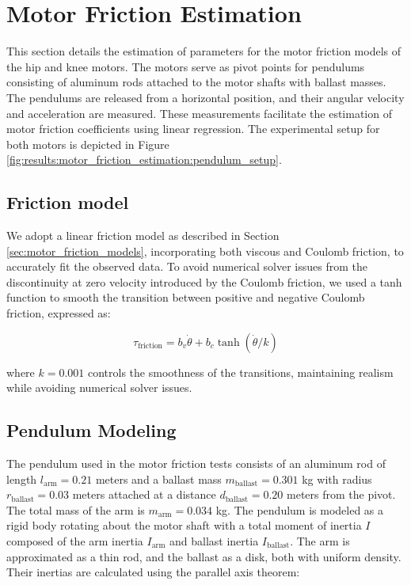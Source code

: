 \section{Motor Friction Estimation}
\label{sec:motor_friction_estimation}

This section details the estimation of parameters for the motor friction models of the hip and knee motors. The motors serve as pivot points for pendulums consisting of aluminum rods attached to the motor shafts with ballast masses. The pendulums are released from a horizontal position, and their angular velocity and acceleration are measured. These measurements facilitate the estimation of motor friction coefficients using linear regression. The experimental setup for both motors is depicted in Figure \ref{fig:results:motor_friction_estimation:pendulum_setup}.

\subsection{Friction model}
We adopt a linear friction model as described in Section \ref{sec:motor_friction_models}, incorporating both viscous and Coulomb friction, to accurately fit the observed data. To avoid numerical solver issues from the discontinuity at zero velocity introduced by the Coulomb friction, we used a tanh function to smooth the transition between positive and negative Coulomb friction, expressed as:

\begin{equation}
\label{eq:friction_model}
\tau_{\text{friction}} = b_v \dot{\theta} + b_c \tanh( \dot{\theta} / k)
\end{equation}

where \(k = 0.001\) controls the smoothness of the transitions, maintaining realism while avoiding numerical solver issues.

\subsection{Pendulum Modeling}
The pendulum used in the motor friction tests consists of an aluminum rod of length \( l_{\text{arm}} = 0.21 \) meters and a ballast mass \( m_{\text{ballast}} = 0.301 \) kg with radius \( r_{\text{ballast}} = 0.03 \) meters attached at a distance \( d_{\text{ballast}} = 0.20 \) meters from the pivot. The total mass of the arm is \( m_{\text{arm}} = 0.034 \) kg. The pendulum is modeled as a rigid body rotating about the motor shaft with a total moment of inertia \( I \) composed of the arm inertia \( I_{\text{arm}} \) and ballast inertia \( I_{\text{ballast}} \). The arm is approximated as a thin rod, and the ballast as a disk, both with uniform density. Their inertias are calculated using the parallel axis theorem:

